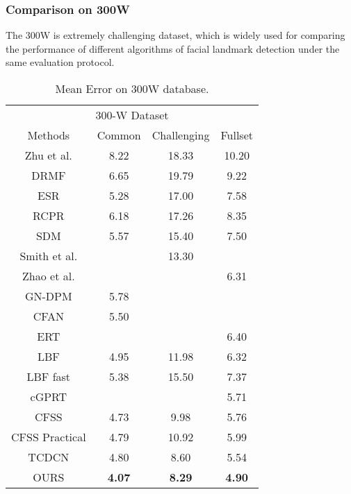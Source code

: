 \documentclass[journal]{IEEEtran}
\begin{document}
\subsubsection{Comparison on 300W}
The 300W is extremely challenging dataset, which is widely used for comparing the performance of different algorithms of facial landmark detection under the same evaluation protocol.

\begin{table}[h]
\small
    \centering \caption{Mean Error on 300W database. }
    \begin{tabular}{c c c c}
        \hline
  \multicolumn{4}{c}{300-W Dataset}\\
 Methods & Common & Challenging & Fullset \\
        \hline
 Zhu et al. & 8.22 & 18.33 & 10.20 \\

  DRMF & 6.65 & 19.79 & 9.22 \\

  ESR & 5.28 & 17.00 & 7.58  \\

  RCPR & 6.18 & 17.26 & 8.35 \\

  SDM & 5.57 & 15.40 & 7.50 \\
  Smith et al. & & 13.30 & \\

  Zhao et al. & &  & 6.31 \\

 GN-DPM & 5.78 & &\\

 CFAN  & 5.50 & & \\

 ERT& & & 6.40 \\

 LBF  & 4.95 & 11.98 & 6.32 \\

 LBF fast  & 5.38 & 15.50 & 7.37 \\

 cGPRT  &  &  & 5.71 \\

 CFSS & 4.73 & 9.98 & 5.76 \\

  CFSS Practical & 4.79 & 10.92 & 5.99 \\
  TCDCN & 4.80 & 8.60 & 5.54 \\
 \hline

 OURS & \textbf{4.07} &  \textbf{8.29} & \textbf{4.90}\\
 \hline
        \end{tabular}
    \label{mean_error_300w}
\end{table}
\end{document}
